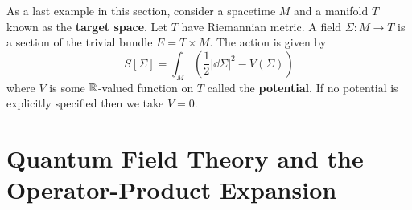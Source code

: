 	\begin{eg}
		As a last example in this section, consider a spacetime $M$ and a manifold $T$ known as the \textbf{target space}. Let $T$ have Riemannian metric. A field $\Sigma: M \to T$ is a section of the trivial bundle $E = T \times M$. The action is given by
		\[
			S[\Sigma] = \int_M \left(\frac12 |\dd\Sigma|^2 - V(\Sigma) \right)
		\]
		where $V$ is some $\mathbb{R}$-valued function on $T$ called the \textbf{potential}. If no potential is explicitly specified then we take $V = 0$.
	\end{eg}
	
	\section{Quantum Field Theory and the Operator-Product Expansion} %
	\label{sec:quantum_field_theory_and_the_operator_product_expansion}
	
